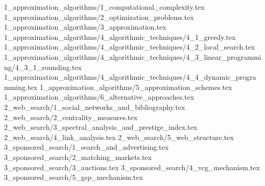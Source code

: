 \documentclass{article}
\begin{document}
	\tableofcontents
	\newpage
	{1_approximation_algorithms/1_computational_complexity.tex}
	{1_approximation_algorithms/2_optimization_problems.tex}
	{1_approximation_algorithms/3_approximation.tex}
	{1_approximation_algorithms/4_algorithmic_techniques/4_1_greedy.tex}
	{1_approximation_algorithms/4_algorithmic_techniques/4_2_local_search.tex}
	{1_approximation_algorithms/4_algorithmic_techniques/4_3_linear_programming/4_3_1_rounding.tex}
	{1_approximation_algorithms/4_algorithmic_techniques/4_4_dynamic_programming.tex}
	{1_approximation_algorithms/5_approximation_schemes.tex}
	{1_approximation_algorithms/6_alternative_approaches.tex}
	{2_web_search/1_social_networks_and_bibliography.tex}
	{2_web_search/2_centrality_measures.tex}
	{2_web_search/3_spectral_analysis_and_prestige_index.tex}
	{2_web_search/4_link_analysis.tex}
	{2_web_search/5_web_structure.tex}
	{3_sponsored_search/1_search_and_advertising.tex}
	{3_sponsored_search/2_matching_markets.tex}
	{3_sponsored_search/3_auctions.tex}
	{3_sponsored_search/4_vcg_mechanism.tex}
	{3_sponsored_search/5_gsp_mechanism.tex}
\end{document}
